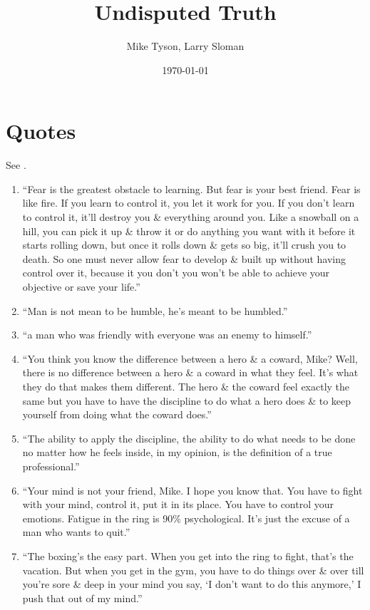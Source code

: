 \documentclass{article}
\title{Undisputed Truth}
\author{Mike Tyson, Larry Sloman}
\date{\today}
\numberwithin{equation}{section}
\begin{document}
\maketitle
\tableofcontents


\section{Quotes}
See \cite{Tyson_Sloman2013}.
\begin{enumerate}
	\item ``Fear is the greatest obstacle to learning. But fear is your best friend. Fear is like fire. If you learn to control it, you let it work for you. If you don't learn to control it, it'll destroy you \& everything around you. Like a snowball on a hill, you can pick it up \& throw it or do anything you want with it before it starts rolling down, but once it rolls down \& gets so big, it'll crush you to death. So one must never allow fear to develop \& built up without having control over it, because it you don't you won't be able to achieve your objective or save your life.''
	\item ``Man is not mean to be humble, he's meant to be humbled.''
	\item ``a man who was friendly with everyone was an enemy to himself.''
	\item ``You think you know the difference between a hero \& a coward, Mike? Well, there is no difference between a hero \& a coward in what they feel. It's what they do that makes them different. The hero \& the coward feel exactly the same but you have to have the discipline to do what a hero does \& to keep yourself from doing what the coward does.''
	\item ``The ability to apply the discipline, the ability to do what needs to be done no matter how he feels inside, in my opinion, is the definition of a true professional.''
	\item ``Your mind is not your friend, Mike. I hope you know that. You have to fight with your mind, control it, put it in its place. You have to control your emotions. Fatigue in the ring is 90\% psychological. It's just the excuse of a man who wants to quit.''
	\item ``The boxing's the easy part. When you get into the ring to fight, that's the vacation. But when you get in the gym, you have to do things over \& over till you're sore \& deep in your mind you say, `I don't want to do this anymore,' I push that out of my mind.''

\end{enumerate}
\end{document}
